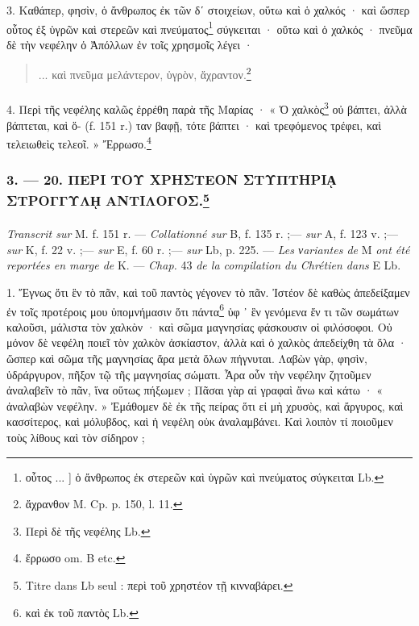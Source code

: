 \documentclass[a4paper, 11pt, oneside, polutonikogreek, french]{article}
\begin{document}
3. Καθάπερ, φησὶν, ὁ ἄνθρωπος ἐκ τῶν δʹ στοιχείων, οὕτω καὶ ὁ χαλκός · καὶ ὥσπερ οὗτος ἐξ ὑγρῶν καὶ στερεῶν καὶ πνεύματος\footnote{οὗτος ... ] ὁ ἄνθρωπος ἐκ στερεῶν καὶ ὑγρῶν καὶ πνεύματος σύγκειται Lb.} σύγκειται · οὕτω καὶ ὁ χαλκός · πνεῦμα δὲ τὴν νεφέλην ὁ Ἀπόλλων ἐν τοῖς χρησμοῖς λέγει ·
\begin{quotation}
... καὶ πνεῦμα μελάντερον, ὑγρὸν, ἄχραντον.\footnote{ἄχρανθον M. Cp. p. 150, l. 11.}
\end{quotation}
\paragraph{}
4. Περὶ τῆς νεφέλης καλῶς ἐρρέθη παρὰ τῆς Μαρίας · « Ὁ χαλκὸς\footnote{Περὶ δὲ τῆς νεφέλης Lb.} οὐ βάπτει, ἀλλὰ βάπτεται, καὶ ὅ- (f. 151 r.) ταν βαφῇ, τότε βάπτει · καὶ τρεφόμενος τρέφει, καὶ τελειωθεὶς τελεοῖ. » Ἔρρωσο.\footnote{ἔρρωσο om. B etc.}

\bigskip
\centerline{\EightStarTaper}
\centerline{\EightStarTaper\EightStarTaper}
\bigskip

\subsubsection[3. --- 20. ΠΕΡΙ ΤΟΥ ΧΡΗΣΤΕΟΝ ΣΤΥΠΤΗΡΙᾼ ΣΤΡΟΓΓΥΛῌ ΑΝΤΙΛΟΓΟΣ.]{3. --- 20. ΠΕΡΙ ΤΟΥ ΧΡΗΣΤΕΟΝ ΣΤΥΠΤΗΡΙᾼ ΣΤΡΟΓΓΥΛῌ ΑΝΤΙΛΟΓΟΣ.\footnote{Titre dans Lb seul : περὶ τοῦ χρηστέον τῇ κινναβάρει.}}
\paragraph{}
\emph{Transcrit sur} M. f. 151 r. --- \emph{Collationné sur} B, f. 135 r. ;--- \emph{sur} A, f. 123 v. ;--- \emph{sur} K, f. 22 v. ;--- \emph{sur} E, f. 60 r. ;--- \emph{sur} Lb, p. 225. --- \emph{Les νariantes de} M \emph{ont été reportées en marge de} K. --- \emph{Chap.} 43 \emph{de la compilation du Chrétien dans} E Lb.

\bigskip

1. Ἔγνως ὅτι ἓν τὸ πᾶν, καὶ τοῦ παντὸς γέγονεν τὸ πᾶν. Ἰστέον δὲ καθὼς ἀπεδείξαμεν ἐν τοῖς προτέροις μου ὑπομνήμασιν ὅτι πάντα\footnote{καὶ ἐκ τοῦ παντὸς Lb.} ὑφ ᾽ ἓν γενόμενα ἕν τι τῶν σωμάτων καλοῦσι, μάλιστα τὸν χαλκὸν · καὶ σῶμα μαγνησίας φάσκουσιν οἱ φιλόσοφοι. Οὐ μόνον δὲ νεφέλη ποιεῖ τὸν χαλκὸν ἀσκίαστον, ἀλλὰ καὶ ὁ χαλκὸς ἀπεδείχθη τὰ ὅλα · ὥσπερ καὶ σῶμα τῆς μαγνησίας ἄρα μετὰ ὅλων πήγνυται. Λαβὼν γὰρ, φησὶν, ὑδράργυρον, πῆξον τῷ τῆς μαγνησίας σώματι. Ἆρα οὖν τὴν νεφέλην ζητοῦμεν ἀναλαβεῖν τὸ πᾶν, ἵνα οὕτως πήξωμεν ; Πᾶσαι γὰρ αἱ γραφαὶ ἄνω καὶ κάτω · « ἀναλαβὼν νεφέλην. » Ἐμάθομεν δὲ ἐκ τῆς πείρας ὅτι εἰ μὴ χρυσὸς, καὶ ἄργυρος, καὶ κασσίτερος, καὶ μόλυβδος, καὶ ἡ νεφέλη οὐκ ἀναλαμβάνει. Καὶ λοιπὸν τί ποιοῦμεν τοὺς λίθους καὶ τὸν σίδηρον ;
\end{document}
